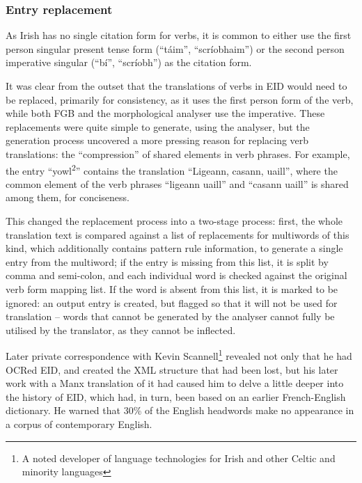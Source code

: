 \subsubsection{Entry replacement}

As Irish has no single citation form for verbs, it is common to either use the first person singular 
present tense form (``t\'aim'', ``scr\'iobhaim'') or the second person imperative singular (``b\'i'', 
``scr\'iobh'') as the citation form.

It was clear from the outset that the translations of verbs in EID would need to be replaced, primarily 
for consistency, as it uses the first person form of the verb, while both FGB and the morphological 
analyser use the imperative. These replacements were quite simple to generate, using the analyser, but 
the generation process uncovered a more pressing reason for replacing verb translations: the ``compression'' 
of shared elements in verb phrases. For example, the entry ``yowl\textsuperscript{2}'' contains the translation 
``Ligeann, casann, uaill'', where the common element of the verb phrases ``ligeann uaill'' and ``casann uaill'' 
is shared among them, for conciseness.

This changed the replacement process into a two-stage process: first, the whole translation text is 
compared against a list of replacements for multiwords of this kind, which additionally contains pattern 
rule information, to generate a single entry from the multiword; if the entry is missing from this list, 
it is split by comma and semi-colon, and each individual word is checked against the original verb form 
mapping list. If the word is absent from this list, it is marked to be ignored: an output entry is created, 
but flagged so that it will not be used for translation -- words that cannot be generated by the analyser 
cannot fully be utilised by the translator, as they cannot be inflected.

Later private correspondence with Kevin Scannell\footnote{A noted developer of language technologies for 
Irish and other Celtic and minority languages} revealed not only that he had OCRed EID, and created the 
XML structure that had been lost, but his later work with a Manx translation of it had caused him to delve 
a little deeper into the history of EID, which had, in turn, been based on an earlier French-English 
dictionary. He warned that 30\% of the English headwords make no appearance in a corpus of contemporary English.

